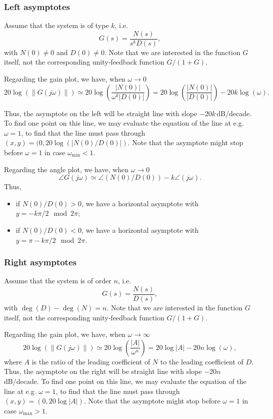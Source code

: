 \documentclass[a4paper,11pt]{report}
\theoremstyle{definition}
\begin{document}
\subsubsection{Left asymptotes}

Assume that the system is of type $k$, i.e.
\[
G(s) = \frac{N(s)}{s^kD(s)},
\]
with $N(0)\neq 0$ and $D(0)\neq 0$. Note that we are interested in the
function $G$ itself, not the corresponding unity-feedback function
$G/(1+G)$. 

Regarding the gain plot, we have, when $\omega\to 0$
\[
20\log(\|G(j\omega)\|) \simeq
20\log\left(\frac{|N(0)|}{\omega^k|D(0)|}\right)
= 20\log\left(\frac{|N(0)|}{|D(0)|}\right) - 20k\log(\omega).
\]

Thus, the asymptote on the left will be straight line with slope
$-20k$\,dB/decade. To find one point on this line, we may evaluate
the equation of the line at e.g. $\omega=1$, to find that the line
must pass through $(x,y)=(0,20\log(|N(0)/D(0)|)$. Note that the
asymptote might stop before $\omega=1$ in case $\omega_{\min} < 1$.

Regarding the angle plot, we have, when $\omega\to 0$
\[
\angle G(j\omega) \simeq \angle(N(0)/D(0)) - k\angle(j\omega).
\]
Thus, 
\begin{itemize}
\item if $N(0)/D(0)>0$, we have a horizontal asymptote with
$y=-k\pi/2 \mod 2\pi$;
\item  if $N(0)/D(0)<0$, we have a horizontal asymptote with
$y=\pi-k\pi/2\mod 2\pi$.
\end{itemize}

\subsubsection{Right asymptotes}

Assume that the system is of order $n$, i.e.
\[
G(s) = \frac{N(s)}{D(s)},
\]
with $\deg(D)-\deg(N)=n$. Note that we are interested in the
function $G$ itself, not the corresponding unity-feedback function
$G/(1+G)$. 

Regarding the gain plot, we have, when $\omega\to \infty$
\[
20\log(\|G(j\omega)\|) \simeq
20\log\left(\frac{|A|}{\omega^n}\right)
= 20\log |A| - 20n\log(\omega),
\]
where $A$ is the ratio of the leading coefficient of $N$ to the
leading coefficient of $D$. Thus, the asymptote on the right will be
straight line with slope $-20n$\,dB/decade. To find one point on this
line, we may evaluate the equation of the line at e.g. $\omega=1$, to
find that the line must pass through $(x,y)=(0,20\log |A|)$. Note that
the asymptote might stop before $\omega=1$ in case $\omega_{\max} >
1$.
\end{document}
